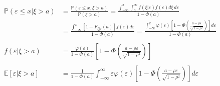 \documentclass[12pt]{article}
\begin{document}
\begin{align*}
\mathbb{P}(\varepsilon \leq x|\xi > a) &= \frac{\mathbb{P}(\varepsilon \leq x,\xi > a)}{\mathbb{P}(\xi > a)} = \frac{\int_{-\infty}^x \int_a^\infty f(\xi|\varepsilon)f(\varepsilon) d \xi \, d \varepsilon }{1 - \Phi(a)}\\
&=\frac{\int_{-\infty}^x [1 - F_{\xi|\varepsilon}(a)]f(\varepsilon) d\varepsilon}{1- \Phi(a)} = \frac{\displaystyle\int_{-\infty}^x \varphi(\varepsilon)\left[1 - \Phi\left( \frac{a - \rho \varepsilon}{\sqrt{1 - \rho^2}} \right)\right]d\varepsilon }{1 - \Phi(a)} \\ \\
f(\varepsilon|\xi > a) &= \frac{\varphi(\varepsilon)}{1-\Phi(a)}\left[1 - \Phi\left( \frac{a - \rho \varepsilon}{\sqrt{1 - \rho^2}} \right)\right] \\ \\
\mathbb{E}\left[ \varepsilon|\xi > a \right] & = \frac{1}{1-\Phi(a)} \int_{-\infty}^\infty \varepsilon \varphi(\varepsilon)\left[1 -  \Phi\left( \frac{a - \rho \varepsilon}{\sqrt{1 - \rho^2}} \right)\right] d\varepsilon
\end{align*}

\end{document}
